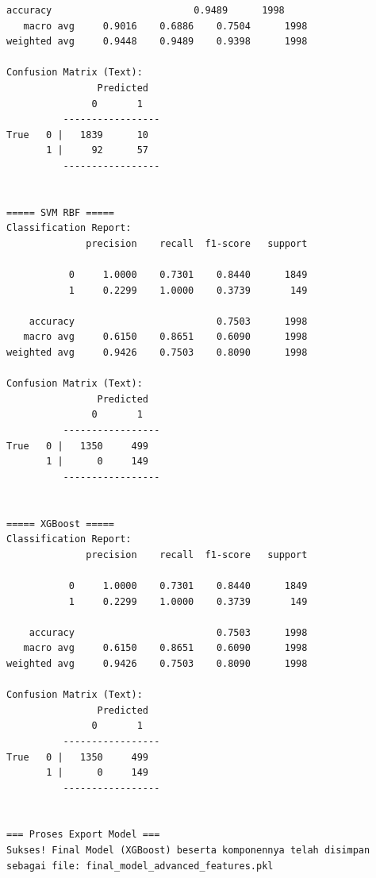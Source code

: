 \begin{lstlisting}[caption={Output 6}]
    accuracy                         0.9489      1998
   macro avg     0.9016    0.6886    0.7504      1998
weighted avg     0.9448    0.9489    0.9398      1998

Confusion Matrix (Text):
                Predicted
               0       1
          -----------------
True   0 |   1839      10
       1 |     92      57
          -----------------


===== SVM RBF =====
Classification Report:
              precision    recall  f1-score   support

           0     1.0000    0.7301    0.8440      1849
           1     0.2299    1.0000    0.3739       149

    accuracy                         0.7503      1998
   macro avg     0.6150    0.8651    0.6090      1998
weighted avg     0.9426    0.7503    0.8090      1998

Confusion Matrix (Text):
                Predicted
               0       1
          -----------------
True   0 |   1350     499
       1 |      0     149
          -----------------


===== XGBoost =====
Classification Report:
              precision    recall  f1-score   support

           0     1.0000    0.7301    0.8440      1849
           1     0.2299    1.0000    0.3739       149

    accuracy                         0.7503      1998
   macro avg     0.6150    0.8651    0.6090      1998
weighted avg     0.9426    0.7503    0.8090      1998

Confusion Matrix (Text):
                Predicted
               0       1
          -----------------
True   0 |   1350     499
       1 |      0     149
          -----------------


=== Proses Export Model ===
Sukses! Final Model (XGBoost) beserta komponennya telah disimpan sebagai file: final_model_advanced_features.pkl
\end{lstlisting}

